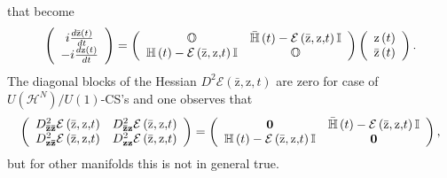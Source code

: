 \documentclass[aps,preprint]{revtex4}%
\begin{document}
that become
\begin{equation}
\left(
\begin{array}
[c]{c}%
i\frac{d\mathrm{\bar{z}}\left(  t\right)  }{dt}\\
-i\frac{d\mathrm{z}\left(  t\right)  }{dt}%
\end{array}
\right)  =\left(
\begin{array}
[c]{cc}%
\mathbb{O} & \mathbb{\bar{H}}\left(  t\right)  -\mathcal{E}\left(
\mathrm{\bar{z},z}\mathbf{,}t\right)  \mathbb{I}\\
\mathbb{H}\left(  t\right)  -\mathcal{E}\left(  \mathrm{\bar{z},z}%
\mathbf{,}t\right)  \mathbb{I} & \mathbb{O}%
\end{array}
\right)  \left(
\begin{array}
[c]{c}%
\mathrm{z}\left(  t\right) \\
\mathrm{\bar{z}}\left(  t\right)
\end{array}
\right)  . \label{TDCI}%
\end{equation}
The diagonal blocks of the Hessian $D^{2}\mathcal{E}\left(  \mathrm{\bar{z}%
,z}\mathbf{,}t\right)  $ are zero for case of $U\left(  \mathcal{H}%
^{N}\right)  /U\left(  1\right)  $-CS's and one observes that
\begin{equation}
\left(
\begin{array}
[c]{cc}%
D_{\mathbf{\bar{z}\bar{z}}}^{2}\mathcal{E}\left(  \mathrm{\bar{z},z}%
\mathbf{,}t\right)  & D_{\mathbf{\bar{z}z}}^{2}\mathcal{E}\left(
\mathrm{\bar{z},z}\mathbf{,}t\right) \\
D_{\mathbf{z\bar{z}}}^{2}\mathcal{E}\left(  \mathrm{\bar{z},z}\mathbf{,}%
t\right)  & D_{\mathbf{zz}}^{2}\mathcal{E}\left(  \mathrm{\bar{z},z}%
\mathbf{,}t\right)
\end{array}
\right)  =\left(
\begin{array}
[c]{cc}%
\mathbf{0} & \mathbb{\bar{H}}\left(  t\right)  -\mathcal{E}\left(
\mathrm{\bar{z},z}\mathbf{,}t\right)  \mathbb{I}\\
\mathbb{H}\left(  t\right)  -\mathcal{E}\left(  \mathrm{\bar{z},z}%
\mathbf{,}t\right)  \mathbb{I} & \mathbf{0}%
\end{array}
\right)  ,
\end{equation}
but for other manifolds this is not in general true.
\end{document}
